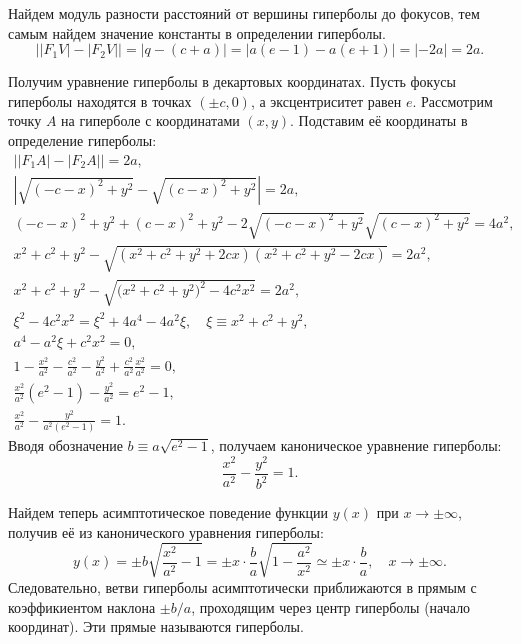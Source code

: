 Найдем модуль разности расстояний от вершины гиперболы до фокусов, тем самым найдем значение константы в определении гиперболы. 
\begin{equation*}
	\big||F_1 V| - |F_2 V|\big| = |q - (c + a)| = |a(e - 1) - a(e + 1)| = |-2a| = 2a.
\end{equation*}

Получим уравнение гиперболы в декартовых координатах. Пусть фокусы гиперболы находятся в точках $(\pm c, 0)$, а эксцентриситет равен $e$. Рассмотрим точку $A$ на гиперболе с координатами $(x,y)$. Подставим её координаты в определение гиперболы:
\begin{gather*}
	\big| |F_1 A| - |F_2 A| \big| = 2a,\\
	\left|\sqrt{(-c - x)^2 + y^2} - \sqrt{(c - x)^2 + y^2} \right| = 2a,\\
	(-c - x)^2 + y^2 + (c - x)^2 + y^2 - 2\sqrt{(-c - x)^2 + y^2}\sqrt{(c - x)^2 + y^2} = 4a^2,\\
	x^2 + c^2 + y^2  - \sqrt{(x^2 + c^2 + y^2 + 2cx ) ( x^2 + c^2 + y^2 - 2cx )} = 2a^2,\\
	x^2 + c^2 + y^2 - \sqrt{\big(x^2 + c^2 + y^2\big)^2 - 4 c^2 x^2} = 2a^2,\\
	\xi^2 - 4 c^2 x^2 = \xi^2 + 4a^4 - 4a^2\xi, \quad \xi \equiv x^2 + c^2 + y^2,\\
	a^4 - a^2 \xi + c^2x^2 = 0,\\
	1 - \frac{x^2}{a^2} - \frac{c^2}{a^2} - \frac{y^2}{a^2} + \frac{c^2}{a^2} \frac{x^2}{a^2} = 0,\\
	\frac{x^2}{a^2} (e^2 - 1) - \frac{y^2}{a^2} = e^2 - 1,\\
	\frac{x^2}{a^2} - \frac{y^2}{a^2(e^2 - 1)} = 1.
\end{gather*}
Вводя обозначение $b \equiv a \sqrt{e^2 - 1}$, получаем каноническое уравнение гиперболы:
\begin{equation}
	\frac{x^2}{a^2}-\frac{y^2}{b^2}=1.
\end{equation}

Найдем теперь асимптотическое поведение функции $y(x)$ при $x \rightarrow \pm \infty$, получив её из канонического уравнения гиперболы:
\begin{equation*}
	 y(x) = \pm b\sqrt{\frac{x^2}{a^2} - 1} =  \pm x \cdot \frac{b}{a}\sqrt{1 - \frac{a^2}{x^2}} \simeq \pm x \cdot \frac{b}{a}, \quad x \rightarrow \pm \infty.
\end{equation*}
Следовательно, ветви гиперболы асимптотически приближаются в прямым с коэффикиентом наклона $\pm b/a$, проходящим через центр гиперболы (начало координат). Эти прямые называются  гиперболы.

